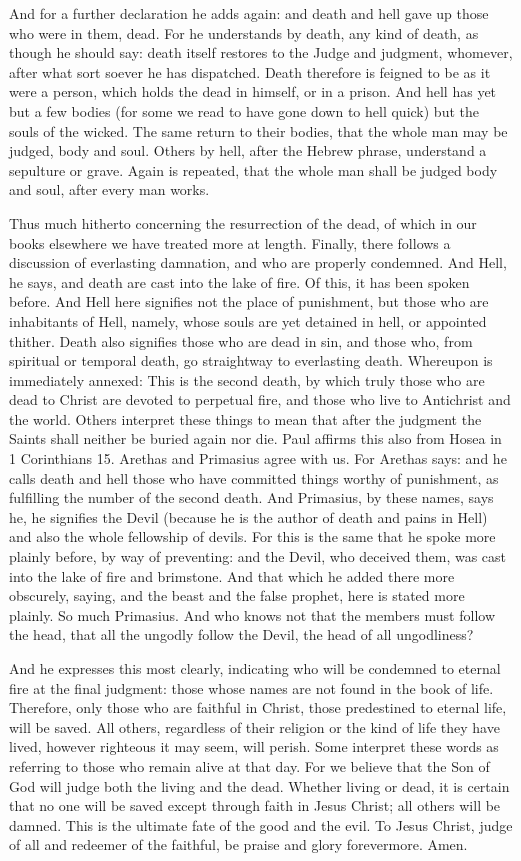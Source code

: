 And for a further declaration he adds again: and death and hell gave up those who were in them, dead. For he understands by death, any kind of death, as though he should say: death itself restores to the Judge and judgment, whomever, after what sort soever he has dispatched. Death therefore is feigned to be as it were a person, which holds the dead in himself, or in a prison. And hell has yet but a few bodies (for some we read to have gone down to hell quick) but the souls of the wicked. The same return to their bodies, that the whole man may be judged, body and soul. Others by hell, after the Hebrew phrase, understand a sepulture or grave. Again is repeated, that the whole man shall be judged body and soul, after every man works.

Thus much hitherto concerning the resurrection of the dead, of which in our books elsewhere we have treated more at length. Finally, there follows a discussion of everlasting damnation, and who are properly condemned. And Hell, he says, and death are cast into the lake of fire. Of this, it has been spoken before. And Hell here signifies not the place of punishment, but those who are inhabitants of Hell, namely, whose souls are yet detained in hell, or appointed thither. Death also signifies those who are dead in sin, and those who, from spiritual or temporal death, go straightway to everlasting death. Whereupon is immediately annexed: This is the second death, by which truly those who are dead to Christ are devoted to perpetual fire, and those who live to Antichrist and the world. Others interpret these things to mean that after the judgment the Saints shall neither be buried again nor die. Paul affirms this also from Hosea in 1 Corinthians 15. Arethas and Primasius agree with us. For Arethas says: and he calls death and hell those who have committed things worthy of punishment, as fulfilling the number of the second death. And Primasius, by these names, says he, he signifies the Devil (because he is the author of death and pains in Hell) and also the whole fellowship of devils. For this is the same that he spoke more plainly before, by way of preventing: and the Devil, who deceived them, was cast into the lake of fire and brimstone. And that which he added there more obscurely, saying, and the beast and the false prophet, here is stated more plainly. So much Primasius. And who knows not that the members must follow the head, that all the ungodly follow the Devil, the head of all ungodliness?

And he expresses this most clearly, indicating who will be condemned to eternal fire at the final judgment: those whose names are not found in the book of life. Therefore, only those who are faithful in Christ, those predestined to eternal life, will be saved. All others, regardless of their religion or the kind of life they have lived, however righteous it may seem, will perish. Some interpret these words as referring to those who remain alive at that day. For we believe that the Son of God will judge both the living and the dead. Whether living or dead, it is certain that no one will be saved except through faith in Jesus Christ; all others will be damned. This is the ultimate fate of the good and the evil. To Jesus Christ, judge of all and redeemer of the faithful, be praise and glory forevermore. Amen.

